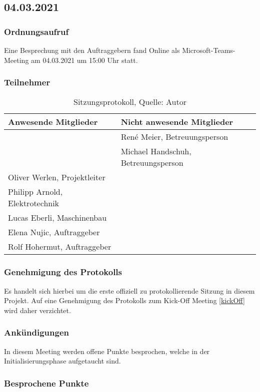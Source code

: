 \subsection{04.03.2021}\label{04.03.2021}
\subsubsection{Ordnungsaufruf}
Eine Besprechung mit den Auftraggebern fand Online als Microsoft-Teams-Meeting am 04.03.2021 um 15:00 Uhr statt.
\subsubsection{Teilnehmer}
\begin{table}[H]
	\setlength\extrarowheight{2pt} %
	\begin{tabularx}{\textwidth}{|X|X|}
		\hline
		\textbf{Anwesende Mitglieder} &  \textbf{Nicht anwesende Mitglieder} \\
		\hline
		& René Meier, Betreuungsperson  \\
		& Michael Handschuh, Betreuungsperson   \\
		Oliver Werlen, Projektleiter &  \\
		Philipp Arnold, Elektrotechnik & \\
		Lucas Eberli, Maschinenbau & \\
		Elena Nujic, Auftraggeber & \\
		Rolf Hohermut, Auftraggeber & \\
		\hline
	\end{tabularx}
	\caption{ \label{tbl: Teilnehmerliste vom 04.03.2021}Sitzungsprotokoll, Quelle: Autor}
\end{table}
\subsubsection{Genehmigung des Protokolls}
Es handelt sich hierbei um die erste offiziell zu protokollierende Sitzung in diesem Projekt. Auf eine Genehmigung des Protokolls zum Kick-Off Meeting \ref{kickOff} wird daher verzichtet. 
\subsubsection{Ankündigungen}
In diesem Meeting werden offene Punkte besprochen, welche in der Initialisierungsphase aufgetaucht sind. 
\subsubsection{Besprochene Punkte}
